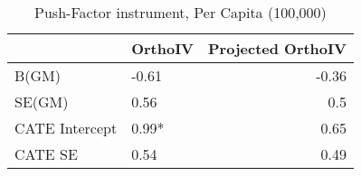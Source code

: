 \begin{table}\centering\caption{Push-Factor instrument, Per Capita (100,000)}\begin{tabular}{llr}
\toprule
                & OrthoIV   &   Projected OrthoIV \\
\midrule
 B(GM)          & -0.61     &               -0.36 \\
 SE(GM)         & 0.56      &                0.5  \\
 CATE Intercept & 0.99*     &                0.65 \\
 CATE SE        & 0.54      &                0.49 \\
\bottomrule
\end{tabular}\end{table}